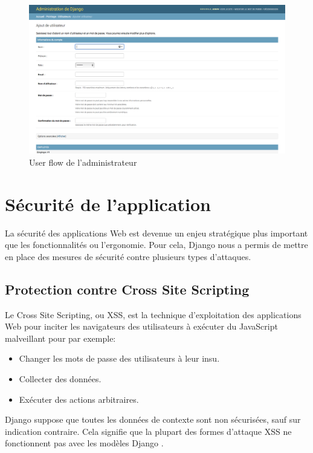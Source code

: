 \begin{figure}[h!]
    \centering
    \includegraphics[scale=0.35]{images/interface/admin_add_employe.png}
    \vspace{-20pt}
    \caption{User flow de l'administrateur}
    \label{fig101}
\end{figure}

\section{Sécurité de l’application}
La sécurité des applications Web est devenue un enjeu stratégique plus
important que les fonctionnalités ou l’ergonomie. Pour cela, Django nous a
permis de mettre en place des mesures de sécurité contre plusieurs types
d’attaques.

\subsection{Protection contre Cross Site Scripting}
Le Cross Site Scripting, ou XSS, est la technique d'exploitation des 
applications Web pour inciter les navigateurs des utilisateurs à exécuter du 
JavaScript malveillant pour par exemple:

\begin{itemize}
    \item[\textbullet] Changer les mots de passe des utilisateurs à leur insu.
    \item[\textbullet] Collecter des données.
    \item[\textbullet] Exécuter des actions arbitraires.
\end{itemize}

Django suppose que toutes les données de contexte sont non sécurisées, sauf sur 
indication contraire. Cela signifie que la plupart des formes d'attaque XSS ne 
fonctionnent pas avec les modèles Django \cite{18}.

